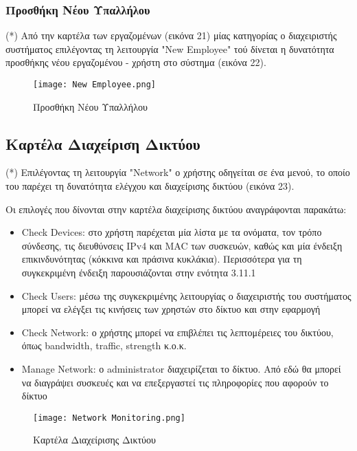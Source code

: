 \documentclass{article}
\begin{document}
\subsubsection{Προσθήκη Νέου Υπαλλήλου}

(*) Από την καρτέλα των εργαζομένων (εικόνα 21) μίας κατηγορίας ο διαχειριστής συστήματος επιλέγοντας τη λειτουργία "New Employee" τού δίνεται η δυνατότητα προσθήκης νέου εργαζομένου - χρήστη στο σύστημα (εικόνα 22).


\newpage

\begin{figure}[!htb]
\centering
\texttt{[image: New Employee.png]} 
\caption{\label{fig: new employee} Προσθήκη Νέου Υπαλλήλου}
\end{figure}

\subsection{Καρτέλα Διαχείριση Δικτύου}

(*) Επιλέγοντας τη λειτουργία "Network" ο χρήστης οδηγείται σε ένα μενού, το οποίο του παρέχει τη δυνατότητα ελέγχου και διαχείρισης δικτύου (εικόνα 23).

Οι επιλογές που δίνονται στην καρτέλα διαχείρισης δικτύου αναγράφονται παρακάτω:
\begin{itemize}
    \item Check Devices: στο χρήστη παρέχεται μία λίστα με τα ονόματα, τον τρόπο σύνδεσης, τις διευθύνσεις IPv4 και MAC των συσκευών, καθώς και μία ένδειξη επικινδυνότητας (κόκκινα και πράσινα κυκλάκια). Περισσότερα για τη συγκεκριμένη ένδειξη παρουσιάζονται στην ενότητα 3.11.1
    \item Check Users: μέσω της συγκεκριμένης λειτουργίας ο διαχειριστής του συστήματος μπορεί να ελέγξει τις κινήσεις των χρηστών στο δίκτυο και στην εφαρμογή
    \item Check Network: ο χρήστης μπορεί να επιβλέπει τις λεπτομέρειες του δικτύου, όπως bandwidth, traffic, strength κ.ο.κ.
    \item Manage Network: ο administrator διαχειρίζεται το δίκτυο. Από εδώ θα μπορεί να διαγράψει συσκευές και να επεξεργαστεί τις πληροφορίες που αφορούν το δίκτυο
\end{itemize}

\begin{figure}[!htb]
\centering
\texttt{[image: Network Monitoring.png]} 
\caption{\label{fig:netowrk monitoring} Καρτέλα Διαχείρισης Δικτύου }
\end{figure}
\end{document}
